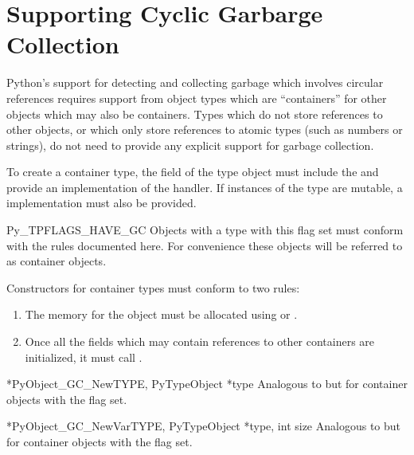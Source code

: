 \documentclass{manual}
\begin{document}
\section{Supporting Cyclic Garbarge Collection
         \label{supporting-cycle-detection}}

Python's support for detecting and collecting garbage which involves
circular references requires support from object types which are
``containers'' for other objects which may also be containers.  Types
which do not store references to other objects, or which only store
references to atomic types (such as numbers or strings), do not need
to provide any explicit support for garbage collection.

To create a container type, the  field of the type
object must include the  and provide an
implementation of the  handler.  If instances of the
type are mutable, a  implementation must also be
provided.

\begin{datadesc}{Py_TPFLAGS_HAVE_GC}
  Objects with a type with this flag set must conform with the rules
  documented here.  For convenience these objects will be referred to
  as container objects.
\end{datadesc}

Constructors for container types must conform to two rules:

\begin{enumerate}
\item  The memory for the object must be allocated using
        or .

\item  Once all the fields which may contain references to other
       containers are initialized, it must call
       .
\end{enumerate}

\begin{cfuncdesc}{*}{PyObject_GC_New}{TYPE, PyTypeObject *type}
  Analogous to  but for container objects with
  the  flag set.
\end{cfuncdesc}

\begin{cfuncdesc}{*}{PyObject_GC_NewVar}{TYPE, PyTypeObject *type,
                                                   int size}
  Analogous to  but for container objects
  with the  flag set.
\end{cfuncdesc}
\end{document}
